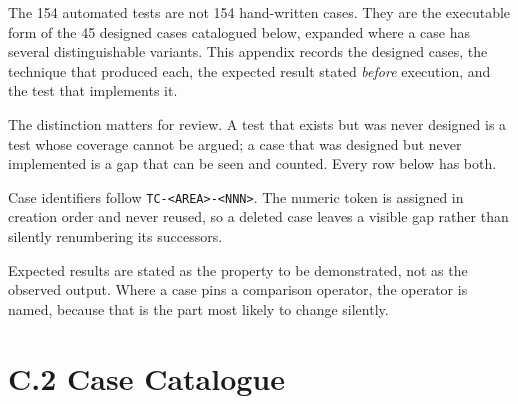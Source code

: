\documentclass[
  12pt,
]{report}
\begin{document}
The 154 automated tests are not 154 hand-written cases. They are the
executable form of the 45 designed cases catalogued below, expanded
where a case has several distinguishable variants. This appendix records
the designed cases, the technique that produced each, the expected
result stated \emph{before} execution, and the test that implements it.

The distinction matters for review. A test that exists but was never
designed is a test whose coverage cannot be argued; a case that was
designed but never implemented is a gap that can be seen and counted.
Every row below has both.

Case identifiers follow
\texttt{TC-\textless{}AREA\textgreater{}-\textless{}NNN\textgreater{}}.
The numeric token is assigned in creation order and never reused, so a
deleted case leaves a visible gap rather than silently renumbering its
successors.

Expected results are stated as the property to be demonstrated, not as
the observed output. Where a case pins a comparison operator, the
operator is named, because that is the part most likely to change
silently.

\section{C.2 Case Catalogue}\label{c.2-case-catalogue}
\end{document}
